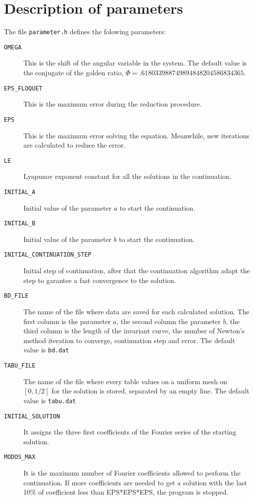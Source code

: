 \documentclass{article}
\begin{document}
\section{Description of parameters} 

The file \texttt{parameter.h} defines the folowing parameters: 
\begin{description}
\item[\texttt{OMEGA}] This is the shift of the angular variable in the
  system. The default value is the conjugate of the golden ratio,
  $\Phi= .618033988749894848204586834365$. 
\item[\texttt{EPS\_FLOQUET}]  This is the maximum error during the
  reduction procedure.
\item[\texttt{EPS}] This is the maximum error solving the
  equation. Meanwhile, new iterations are calculated to reduce the
  error. 
\item[\texttt{LE}] Lyapunov exponent constant for all the solutions in
  the continuation. 
\item[\texttt{INITIAL\_A}] Initial value of the parameter $a$ to start the
  continuation. 
\item[\texttt{INITIAL\_B}] Initial value of the parameter $b$ to start the
  continuation. 
\item[\texttt{INITIAL\_CONTINUATION\_STEP}] Initial step of
  continuation, after that the continuation algorithm adapt the step to garantee
  a fast convergence to the solution.
\item[\texttt{BD\_FILE}] The name of the file where data are saved for
  each calculated solution. The first column is the parameter $a$, the
  second column the parameter $b$, the third column is the length of
  the invariant  curve, the number of Newton's method iteration to converge,
  continuation step and error. The default value is \texttt{bd.dat}
\item[\texttt{TABU\_FILE}] The name of the file where every table
  values on a uniform mesh on $[0,1/2]$ for the solution
  is stored, separated by an empty line. The default value is \texttt{tabu.dat}
\item[\texttt{INITIAL\_SOLUTION}]  It assigns  the three first coefficients of
  the Fourier series of the starting solution.  
\item[\texttt{MODOS\_MAX}] It is the maximum number of Fourier
  coefficients allowed to perform the continuation. If more coefficients
  are needed to get a solution with the last 10\% of coefficient less
  than EPS*EPS*EPS, the program is stopped. 
\end{description}
\end{document}
